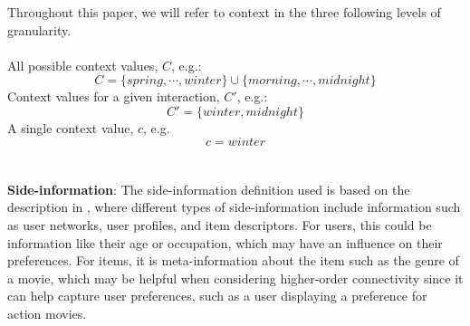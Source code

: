 Throughout this paper, we will refer to context in the three following levels of granularity.\\\\
All possible context values, $C$, e.g.:
$$C = \{spring, \cdots, winter\} \cup \{morning, \cdots, midnight\}$$
Context values for a given interaction, $C'$, e.g.:
$$C' = \{winter, midnight\}$$
A single context value, $c$, e.g. 
$$c = winter$$
\\\\
\textbf{Side-information}:
The side-information definition used is based on the description in \cite{SideInfoDefinition}, where different types of side-information include information such as user networks, user profiles, and item descriptors.
For users, this could be information like their age or occupation, which may have an influence on their preferences.
For items, it is meta-information about the item such as the genre of a movie, which may be helpful when considering higher-order connectivity since it can help capture user preferences, such as a user displaying a preference for action movies.



